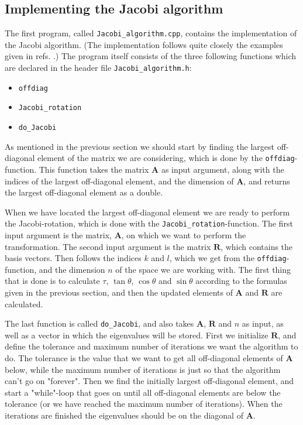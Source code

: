 \documentclass[12pt, a4paper]{article}
\begin{document}
\subsection{Implementing the Jacobi algorithm}

The first program, called \texttt{Jacobi\_algorithm.cpp}, contains the implementation of the 
Jacobi algorithm. (The implementation follows quite closely the examples given in refs.  
\cite{Lecture Notes, Lectures Eigenvalue Problems}.) The program itself consists of the three following
functions which are declared in the header file \texttt{Jacobi\_algorithm.h}: 
\begin{itemize}
\item \texttt{offdiag}
\item \texttt{Jacobi\_rotation}
\item \texttt{do\_Jacobi}
\end{itemize}

As mentioned in the previous section we should start by finding the largest off-diagonal element of 
the matrix we are considering, which is done by the \texttt{offdiag}-function. This function takes the 
matrix $\mathbf{A}$ as input argument, along with the indices of the largest off-diagonal element, and 
the dimension of $\mathbf{A}$, and returns the largest off-diagonal element as a double. 

When we have located the largest off-diagonal element we are ready to perform the Jacobi-rotation, 
which is done with the \texttt{Jacobi\_rotation}-function. The first input argument is the matrix, 
$\mathbf{A}$, on which we want to perform the transformation. The second input argument is the matrix
$\mathbf{R}$, which contains the basis vectors. Then follows the indices $k$ and $l$, which we get from 
the \texttt{offdiag}-function, and the dimension $n$ of the space we are working with.    
The first thing that is done is to calculate $\tau$, $\tan\theta$, $\cos\theta$ and $\sin\theta$ 
according to the formulas given in the previous section, and then the updated elements of $\mathbf{A}$ and 
$\mathbf{R}$ are calculated.

The last function is called \texttt{do\_Jacobi}, and also takes $\mathbf{A}$, $\mathbf{R}$ and $n$ as 
input, as well as a vector in which the eigenvalues will be stored. First we initialize $\mathbf{R}$, 
and define the tolerance and maximum number of iterations we want the algorithm to do. The tolerance is 
the value that we want to get all off-diagonal elements of $\mathbf{A}$ below, while the maximum number of 
iterations is just so that the algorithm can't go on "forever". Then we find the initially largest 
off-diagonal element, and start a "while"-loop that goes on until all off-diagonal elements are below 
the tolerance (or we have reached the maximum number of iterations). When the iterations are finished 
the eigenvalues should be on the diagonal of $\mathbf{A}$. 
\end{document}
